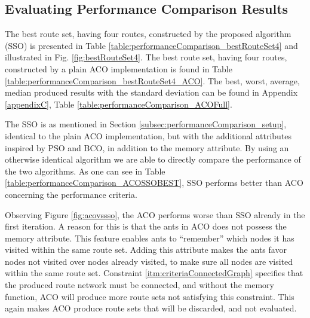 \subsection{Evaluating Performance Comparison Results}
\label{subsec:evaluating_PerfomanceComparison}


The best route set, having four routes, constructed by the proposed algorithm (SSO) is presented in Table \vref{table:performanceComparison_bestRouteSet4} and illustrated in Fig. \vref{fig:bestRouteSet4}. The best route set, having four routes, constructed by a plain ACO implementation is found in Table \vref{table:performanceComparison_bestRouteSet4_ACO}. The best, worst, average, median produced results with the standard deviation can be found in Appendix \ref{appendixC}, Table \vref{table:performanceComparison_ACOFull}. 

The SSO is as mentioned in Section \vref{subsec:performanceComparison_setup}, identical to the plain ACO implementation, but with the additional attributes inspired by PSO and BCO, in addition to the memory attribute. By using an otherwise identical algorithm we are able to directly compare the performance of the two algorithms. As one can see in Table \vref{table:performanceComparison_ACOSSOBEST}, SSO performs better than ACO concerning the performance criteria. 

Observing Figure \ref{fig:acovssso}, the ACO performs worse than SSO already in the first iteration. A reason for this is that the ants in ACO does not possess the memory attribute. This feature enables ants to ``remember'' which nodes it has visited within the same route set. Adding this attribute makes the ants favor nodes not visited over nodes already visited, to make sure all nodes are visited within the same route set. Constraint \vref{itm:criteriaConnectedGraph} specifies that the produced route network must be connected, and without the memory function, ACO will produce more route sets not satisfying this constraint. This again makes ACO produce route sets that will be discarded, and not evaluated. %

